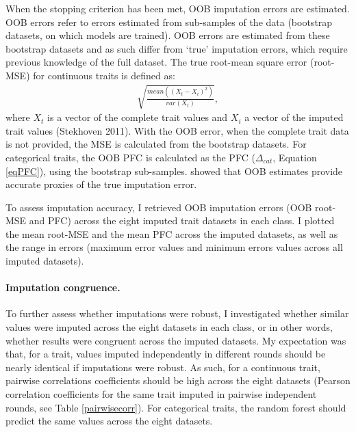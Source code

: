 When the stopping criterion has been met, OOB imputation errors are estimated.
OOB errors refer to errors estimated from sub-samples of the data (bootstrap datasets, on which models are trained). OOB errors are estimated from these bootstrap datasets and as such differ from `true' imputation errors, which require previous knowledge of the full dataset. The true root-mean square error (root-MSE) for continuous traits is defined as: 
\begin{align}
\sqrt{\frac{mean\left(\left(X_t-X_i\right)^2\right)}{var\left(X_t\right)}}, 
\end{align}
where $X_t$ is a vector of the complete trait values and $X_i$ a vector of the imputed trait values (Stekhoven 2011). With the OOB error, when the complete trait data is not provided, the MSE is calculated from the bootstrap datasets. For categorical traits, the OOB PFC is calculated as the PFC ($\Delta_{cat}$, Equation \ref{eqPFC}), using the bootstrap sub-samples. \cite{Breiman2001} showed that OOB estimates provide accurate proxies of the true imputation error. 

To assess imputation accuracy, I retrieved OOB imputation errors (OOB root-MSE and PFC) across the eight imputed trait datasets in each class. I plotted the mean root-MSE and the mean PFC across the imputed datasets, as well as the range in errors (maximum error values and minimum errors values across all imputed datasets).

\paragraph{Imputation congruence.} To further assess whether imputations were robust, I investigated whether similar values were imputed across the eight datasets in each class, or in other words, whether results were congruent across the imputed datasets.  My expectation was that, for a trait, values imputed independently in different rounds should be nearly identical if imputations were robust. As such, for a continuous trait, pairwise correlations coefficients should be high across the eight datasets (Pearson correlation coefficients for the same trait imputed in pairwise independent rounds, see Table \ref{pairwisecorr}). For categorical traits, the random forest should predict the same values across the eight datasets. 

